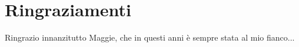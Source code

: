 \chapter*{Ringraziamenti}

Ringrazio innanzitutto Maggie, che in questi anni è sempre stata al mio fianco...